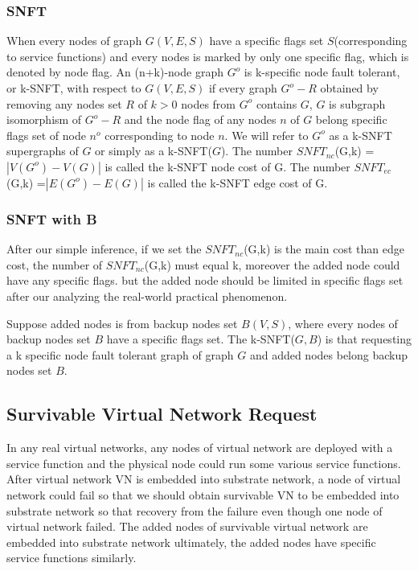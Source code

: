 \subsubsection{SNFT}
When every nodes of graph $G(V,E,S)$ have a specific flags set $S$(corresponding to service functions) and every nodes is marked by only one specific flag, which is denoted by node flag. An (n+k)-node graph $G^o$ is k-specific node fault tolerant, or k-SNFT, with respect to $G(V,E,S)$ if every graph $G^o-R$ obtained by removing any nodes set $R$ of $k>0$ nodes from $G^o$ contains $G$, $G$ is subgraph isomorphism of $G^o-R$ and the node flag of any nodes $n$ of $G$ belong specific flags set of node $n^o$ corresponding to node $n$. We will refer to $G^o$ as a k-SNFT supergraphs of $G$ or simply as a k-SNFT($G$). The number $SNFT_{nc}$(G,k) =$|V(G^o)-V(G)|$ is called the k-SNFT node cost of G. The number $SNFT_{ec}$(G,k) =$|E(G^o)-E(G)|$ is called the k-SNFT edge cost of G.
\subsubsection{SNFT with B}
After our simple inference, if we set the $SNFT_{nc}$(G,k) is the main cost than edge cost, the number of $SNFT_{nc}$(G,k) must equal k, moreover the added node could have any specific flags. but the added node should be limited in specific flags set after our analyzing the real-world practical phenomenon.

Suppose added nodes is from backup nodes set $B(V,S)$, where every nodes of backup nodes set $B$ have a specific flags set. The k-SNFT($G,B$) is that requesting a k specific node fault tolerant graph of graph $G$ and added nodes belong backup nodes set $B$.


\subsection{Survivable Virtual Network Request}
In any real virtual networks, any nodes of virtual network  are deployed with a service function and the physical node could run some various service functions. After virtual network VN is embedded into substrate network, a node of virtual network could fail so that we should obtain survivable VN to be embedded into substrate network so that recovery from the failure even though one node of virtual network failed. The added nodes of survivable virtual network are embedded into substrate network ultimately, the added nodes have specific service functions similarly.




